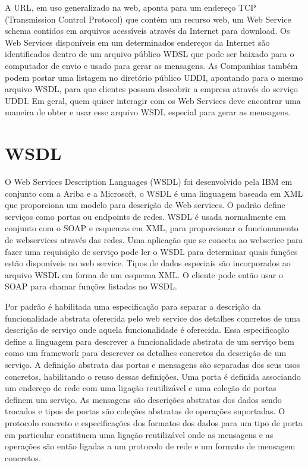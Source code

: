 \documentclass{acm_proc_article-sp}
\begin{document}
		A URL, em uso generalizado na web, aponta para um endereço TCP (Transmission Control Protocol) que contém um recurso web, um Web Service schema contidos em arquivos acessíveis através da Internet  para download. Os Web Services disponíveis em um determinados endereços da Internet são identificados dentro de um arquivo público WDSL que pode ser baixado para o computador de envio e usado para gerar as mensagens. As Companhias também podem postar uma listagem no diretório público UDDI, apontando para o mesmo arquivo WSDL, para que clientes possam descobrir a empresa através do serviço UDDI. Em geral, quem quiser interagir com os Web Services deve encontrar uma maneira de obter e usar esse arquivo WSDL especial para gerar as mensagens.
		
		
\section{WSDL}
	
		O Web Services Description Languages (WSDL) foi desenvolvido pela IBM em conjunto com a Ariba e a Microsoft, o WSDL é uma linguagem baseada em XML que proporciona um modelo para descrição de Web services. O padrão define serviços como portas ou endpoints de redes. WSDL é usada normalmente em conjunto com o SOAP e esquemas em XML, para proporcionar o funcionamento de webservices através das redes. Uma aplicação que se conecta ao webserice para fazer uma requisição de serviço pode ler o WSDL para determinar quais funções estão disponíveis no web service. Tipos de dados especiais são incorporados ao arquivo WSDL em forma de um esquema XML. O cliente pode então usar o SOAP para chamar funções listadas no WSDL.
		
		Por padrão é habilitada uma especificação para separar a descrição da funcionalidade abstrata oferecida pelo web service dos detalhes concretos de uma descrição de serviço onde aquela funcionalidade é oferecida. Essa especificação define a linguagem para descrever a funcionalidade abstrata de um serviço bem como um framework para descrever os detalhes concretos da descrição de um serviço. A definição abstrata das portas e mensagens são separadas dos seus usos concretos, habilitando o reuso dessas definições. Uma porta é definida associando um endereço de rede com uma ligação reutilizável e uma coleção de portas definem um serviço. As mensagens são descrições abstratas dos dados sendo trocados e tipos de portas são coleções abstratas de operações suportadas. O protocolo concreto e especificações dos formatos dos dados para um tipo de porta em particular constituem uma ligação reutilizável onde as mensagens e as operações são então ligadas a um protocolo de rede e um formato de mensagem concretos. \cite{APACHE-AXIS}
		
\end{document}

